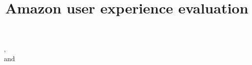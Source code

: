 \documentclass[fleqn]{IOS-Book-Article}
\begin{document}


\newpage

%
%
%

%

\pagestyle{plain}
\setcounter{page}{1}

\begin{frontmatter}    

\title{Amazon user experience evaluation}

\author{ }, \\ %
and
\author{ }

\address{Department of Computer Science, Aalborg University, Denmark}





%
\end{frontmatter}



%
\end{document}
